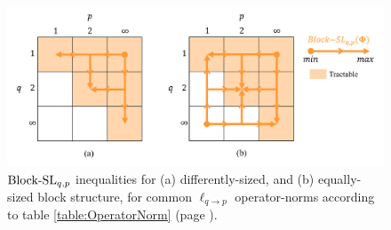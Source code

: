 \begin{figure}[hb]
\centering
\includegraphics[width=.8\textwidth,keepaspectratio]{images/BSLqp_Inequalities.png} 
\centering
\caption{$\mathrm{Block\text{{-}}SL}_{q,p}$ inequalities for (a) differently-sized, and (b) equally-sized block structure, for common $\ell_{q {\to} p}$ operator-norms according to table \ref{table:OperatorNorm} (page \pageref{table:OperatorNorm}).}
\label{fig:BSLqp_Inequalities}
\end{figure}